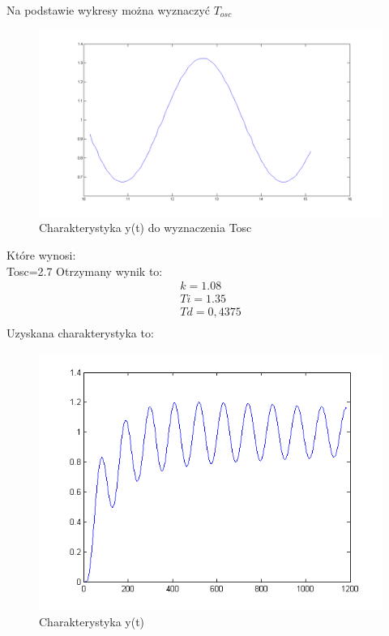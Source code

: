 \documentclass[a4paper,10pt]{article}
\begin{document}
Na podstawie wykresy można wyznaczyć $T_{osc}$
\begin{figure}[!h]
    \centering
	\includegraphics[width=130mm]{CW2-Z3-tosc.png}
	\caption{Charakterystyka y(t) do wyznaczenia Tosc}
    \label{fig:z3-fe2}
\end{figure}
\newline
Które wynosi:\\
Tosc=2.7
\newline
Otrzymany wynik to:\\
\begin{eqnarray}
\nonumber k=1.08\\
\nonumber Ti=1.35\\
\nonumber Td=0,4375\\
\end{eqnarray}
\newpage
Uzyskana charakterystyka to:\\
\begin{figure}[!h]
    \centering
	\includegraphics[width=130mm]{CW2-Z3-wyn.png}
	\caption{Charakterystyka y(t)}
    \label{fig:z3-wyn}
\end{figure}
\newpage
\end{document}

